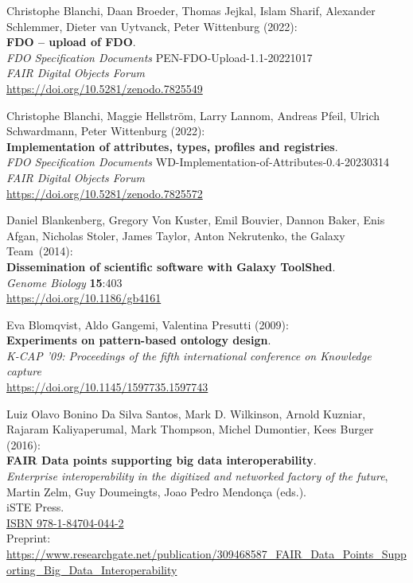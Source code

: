 \begin{thebibliography}{9}
Christophe Blanchi, Daan Broeder, Thomas Jejkal, Islam Sharif, Alexander
Schlemmer, Dieter van Uytvanck, Peter Wittenburg (2022): \\
\textbf{FDO -- upload of FDO}.\\
\emph{FDO Specification Documents} PEN-FDO-Upload-1.1-20221017 \\
\emph{FAIR Digital Objects Forum}\\ 
\url{https://doi.org/10.5281/zenodo.7825549}

Christophe Blanchi, Maggie Hellström, Larry Lannom, Andreas Pfeil, Ulrich Schwardmann, Peter Wittenburg (2022): \\
\textbf{Implementation of
attributes, types, profiles and registries}. \\
\emph{FDO Specification Documents} WD-Implementation-of-Attributes-0.4-20230314 \\
\emph{FAIR Digital Objects Forum}\\ 
\url{https://doi.org/10.5281/zenodo.7825572}

Daniel Blankenberg, Gregory Von Kuster, Emil Bouvier, Dannon
Baker, Enis Afgan, Nicholas Stoler, James Taylor, Anton Nekrutenko, the
Galaxy Team~(2014):\\
\textbf{Dissemination of scientific software with Galaxy ToolShed}.\\
\emph{Genome Biology} \textbf{15}:403\\
\url{https://doi.org/10.1186/gb4161}

Eva Blomqvist, Aldo Gangemi, Valentina Presutti (2009):\\
\textbf{Experiments on pattern-based ontology design}.\\
\emph{K-CAP '09: Proceedings of the fifth international conference on Knowledge capture}\\
\url{https://doi.org/10.1145/1597735.1597743}

Luiz Olavo Bonino Da Silva Santos, Mark D. Wilkinson, Arnold Kuzniar,
Rajaram Kaliyaperumal, Mark Thompson, Michel Dumontier, Kees Burger
(2016):\\
\textbf{FAIR Data points supporting big data interoperability}. \\
\emph{Enterprise interoperability in the digitized and networked factory of the future}, Martin Zelm, Guy Doumeingts, Joao Pedro Mendonça (eds.).\\
iSTE Press. \\
\href{http://www.iste.co.uk/book.php?id=1073}{ISBN 978-1-84704-044-2} \\
Preprint: \url{https://www.researchgate.net/publication/309468587_FAIR_Data_Points_Supporting_Big_Data_Interoperability}


\end{thebibliography}
